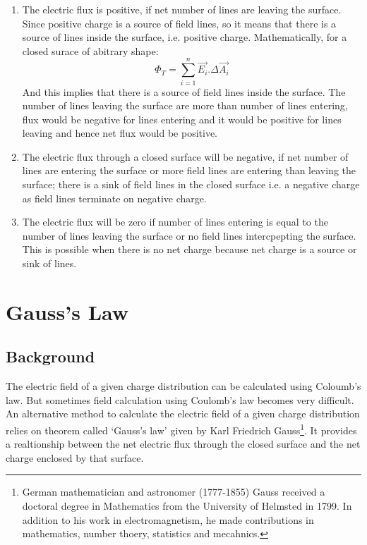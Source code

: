 \begin{enumerate}[label=(\roman*)]
\item The electric flux is positive, if net number of lines are leaving
the surface. Since positive charge is a source of field lines,
so it means that there is a source of lines inside the surface,
i.e. positive charge.
Mathematically, for a closed surace of abitrary shape:
\begin{equation} 
  \Phi_{T} = \sum_{i=1}^{n} \vec{E_{i}}.\Delta \vec{A_{i}} \nonumber
\end{equation}
And this implies that there is a source of field lines inside the surface.
The number of lines leaving the surface are more than number of lines
entering, flux would be negative for lines entering and it would be
positive for lines leaving and hence net flux would be positive.
\item The electric flux through a closed surface will be negative,
if net number of lines are entering the surface or more field lines are entering than leaving the surface;
there is a sink of field lines in the closed surface i.e. a negative charge as field lines terminate on negative charge.
\item The electric flux will be zero if number of lines entering is 
equal to the number of lines leaving the surface or no field lines
intercpepting the surface. This is possible when there is no net charge
because net charge is a source or sink of lines.
\end{enumerate}
\section{Gauss’s Law}
\subsection*{Background}
The electric field of a given charge distribution can be calculated
using Coloumb’s law. But sometimes field calculation using Coulomb’s law
becomes very difficult. An alternative method to calculate the electric
field of a given charge distribution relies on theorem called `Gauss’s law’
given by Karl Friedrich Gauss\footnote{German mathematician and astronomer (1777-1855) Gauss received a doctoral degree
in Mathematics from the University of Helmsted in 1799. In addition to his
work in electromagnetism, he made contributions in mathematics,
number thoery, statistics and mecahnics.}.
It provides a realtionship between the net electric flux
through the closed surface and the net charge enclosed by that surface.
